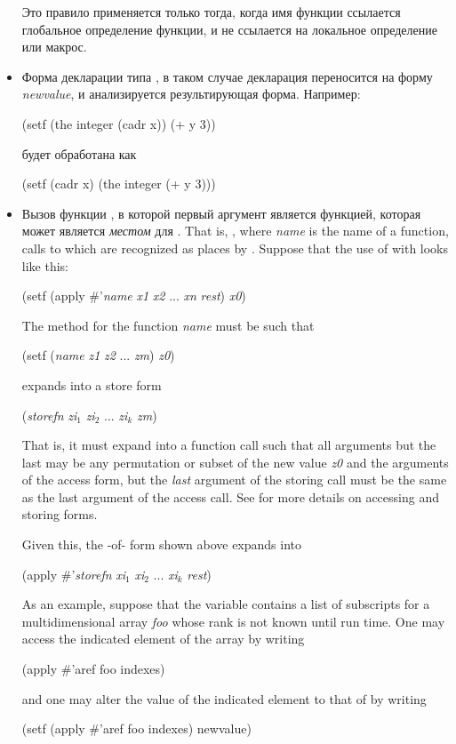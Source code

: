 \begin{defmac}
\begin{itemize}
Это правило применяется только тогда, когда имя функции ссылается глобальное
определение функции, и не ссылается на локальное определение или макрос.

\item
Форма декларации типа , в таком случае декларация переносится на форму
\emph{newvalue}, и анализируется результирующая  форма. Например:
\begin{lisp}
(setf (the integer (cadr x)) (+ y 3))
\end{lisp}
будет обработана как
\begin{lisp}
(setf (cadr x) (the integer (+ y 3)))
\end{lisp}

\item 
Вызов функции , в которой первый аргумент является функцией, которая
может является \emph{местом} для .
That is, , where \emph{name}
is the name of a function, calls to which are recognized as places by .
Suppose that the use of  with  looks like this:
\begin{lisp}
(setf (apply \#'\emph{name} \emph{x1} \emph{x2} ... \emph{xn} \emph{rest}) \emph{x0})
\end{lisp}
The  method for the function \emph{name} must be such that
\begin{lisp}
(setf (\emph{name} \emph{z1} \emph{z2} ... \emph{zm}) \emph{z0})
\end{lisp}
expands into a store form
\begin{lisp}
(\emph{storefn} \emph{zi${}_1$} \emph{zi${}_2$} ... \emph{zi${}_k$} \emph{zm})
\end{lisp}
That is, it must expand into a function call such that all arguments but
the last may be any permutation or subset of the new value \emph{z0} and
the arguments of the access form, but the \emph{last} argument of the storing
call must be the same as the last argument of the access call.
See  for more details on accessing
and storing forms.

Given this, the -of- form shown above expands into
\begin{lisp}
(apply \#'\emph{storefn} \emph{xi${}_1$} \emph{xi${}_2$} ... \emph{xi${}_k$} \emph{rest})
\end{lisp}
As an example, suppose that the variable  contains a list
of subscripts for a multidimensional array \emph{foo} whose rank is not
known until run time.  One may access the indicated
element of the array by writing
\begin{lisp}
(apply \#'aref foo indexes)
\end{lisp}
and one may alter the value of the indicated element to that
of  by writing
\begin{lisp}
(setf (apply \#'aref foo indexes) newvalue)
\end{lisp}


\end{itemize}
\end{defmac}
